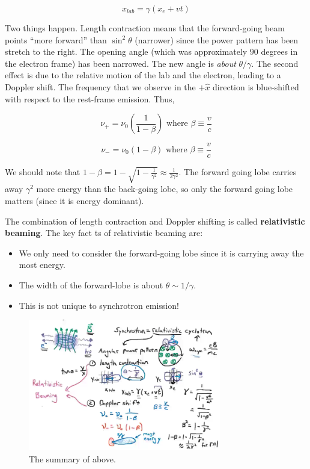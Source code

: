 \documentclass{article}
\begin{document}
$$
x_{lab} = \gamma \left(x_e + vt\right)
$$

Two things happen. Length contraction means that the forward-going beam points ``more forward'' than $\sin^2\theta$ (narrower) since the power pattern has been stretch to the right. The opening angle (which was approximately $90$ degrees in the electron frame) has been narrowed. The new angle is \textit{about} $\theta/\gamma$. The second effect is due to the relative motion of the lab and the electron, leading to a Doppler shift. The frequency that we observe in the $+\hat x$ direction is blue-shifted with respect to the rest-frame emission. Thus,

$$
\nu_+ = \nu_0 \left(\frac{1}{1-\beta}\right) \text{ where } \beta \equiv \frac{v}{c}
$$

$$
\nu_- = \nu_0 \left(1-\beta\right) \text{ where } \beta \equiv \frac{v}{c}
$$

We should note that $1 - \beta = 1 - \sqrt{1-\frac{1}{\gamma^2}} \approx \frac{1}{2\gamma^2}$. The forward going lobe carries away $\gamma^2$ more energy than the back-going lobe, so only the forward going lobe matters (since it is energy dominant). 

The combination of length contraction and Doppler shifting is called \textbf{relativistic beaming}. The key fact ts of relativistic beaming are:

\begin{itemize}
    \item We only need to consider the forward-going lobe since it is carrying away the most energy. 
    \item The width of the forward-lobe is about $\theta \sim 1/\gamma$.
    \item This is not unique to synchrotron emission!
\end{itemize}

\begin{figure}
    \centering
    \includegraphics[width=0.75\textwidth]{figures/Screen Shot 2020-11-02 at 3.11.23 PM.png}
    \caption{The summary of above.}
    \label{fig:summmmmmmmm}
\end{figure}
\end{document}

